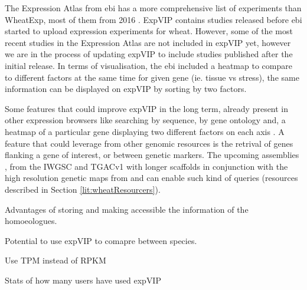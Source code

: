 The Expression Atlas from \acrshort{ebi} has a more comprehensive list of experiments than WheatExp, most of them from 2016 \citep{Petryszak2016}. 
ExpVIP contains studies released before \acrshort{ebi} started to upload expression experiments for wheat. 
However, some of the most recent studies in the Expression Atlas are not included in expVIP yet, however we are in the process of updating expVIP to include studies published after the initial release.
In terms of visualisation, the \acrshort{ebi} included a heatmap to compare to different factors at the same time for given gene (ie. tissue vs stress), the same information can be displayed on expVIP by sorting by two factors.

Some features that could improve expVIP in the long term, already present in other expression browsers like searching by sequence, by gene ontology and, a heatmap of a particular gene displaying two different factors on each axis . 
A feature that could leverage from other genomic resources is the retrival of genes flanking a gene of interest, or between genetic markers. 
The upcoming assemblies , from the IWGSC \citep{Clark2016} and TGACv1 \citep{Pozniak2016}  with longer scaffolds in conjunction with the high resolution genetic maps from \citet{Wang2014} and \citet{Chapman2015} can enable such kind of queries (resources described in Section \ref{lit:wheatResourcers}). 




Advantages of storing and making accessible the information of the homoeologues. 

Potential to use expVIP to comapre between species. 

Use TPM instead of RPKM

Stats of how many users have used expVIP



